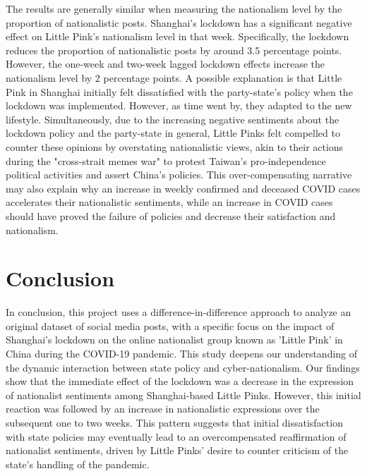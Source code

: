 \documentclass[12pt, ]{article}
\begin{document}
The results are generally similar when measuring the nationalism level by the proportion of nationalistic posts. Shanghai’s lockdown has a significant negative effect on Little Pink’s nationalism level in that week. Specifically, the lockdown reduces the proportion of nationalistic posts by around 3.5 percentage points. However, the one-week and two-week lagged lockdown effects increase the nationalism level by 2 percentage points. A possible explanation is that Little Pink in Shanghai initially felt dissatisfied with the party-state’s policy when the lockdown was implemented. However, as time went by, they adapted to the new lifestyle. Simultaneously, due to the increasing negative sentiments about the lockdown policy and the party-state in general, Little Pinks felt compelled to counter these opinions by overstating nationalistic views, akin to their actions during the "cross-strait memes war" to protest Taiwan's pro-independence political activities and assert China’s policies. This over-compensating narrative may also explain why an increase in weekly confirmed and deceased COVID cases accelerates their nationalistic sentiments, while an increase in COVID cases should have proved the failure of policies and decrease their satisfaction and nationalism.


\hypertarget{conclusion}{%
\section{Conclusion}\label{conclusion}}

In conclusion, this project uses a difference-in-difference approach to analyze an original dataset of social media posts, with a specific focus on the impact of Shanghai's lockdown on the online nationalist group known as 'Little Pink' in China during the COVID-19 pandemic.  This study deepens our understanding of the dynamic interaction between state policy and cyber-nationalism. Our findings show that the immediate effect of the lockdown was a decrease in the expression of nationalist sentiments among Shanghai-based Little Pinks. However, this initial reaction was followed by an increase in nationalistic expressions over the subsequent one to two weeks. This pattern suggests that initial dissatisfaction with state policies may eventually lead to an overcompensated reaffirmation of nationalist sentiments, driven by Little Pinks’ desire to counter criticism of the state's handling of the pandemic.
\end{document}
